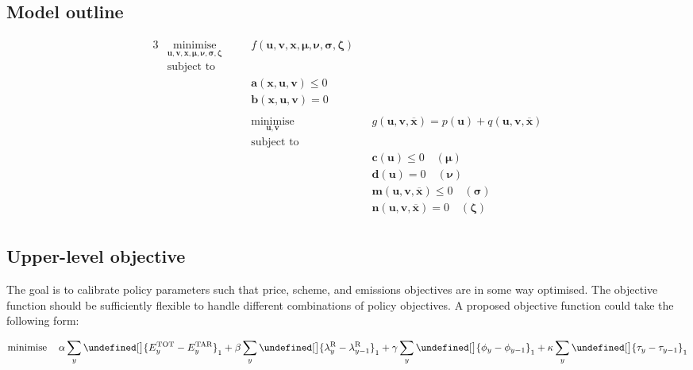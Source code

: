 \documentclass{article}
\newcommand{\iYear}{y}
\newcommand{\vBaseline}[1][\iYear]{\phi_{#1}}
\newcommand{\vPermitPrice}[1][\iYear]{\tau_{#1}}
\newcommand{\vEmissionsTotal}{E^{\textrm{TOT}}_{\iYear}}
\newcommand{\cEmissionsTarget}{E^{\textrm{TAR}}_{\iYear}}
\newcommand{\dPriceMetric}[1][\iYear]{\lambda^{\textrm{R}}_{#1}}
\let\norm\undefined %
\DeclarePairedDelimiter\norm{\lVert}{\rVert}
\DeclareMathOperator*{\minimise}{minimise}
\begin{document}
\subsection{Model outline}
\begin{alignat}{3}
& \minimise\limits_{\bm{u}, \bm{v}, \bm{x}, \bm{\mu}, \bm{\nu}, \bm{\sigma}, \bm{\zeta}} \quad && f\left(\bm{u}, \bm{v}, \bm{x}, \bm{\mu}, \bm{\nu}, \bm{\sigma}, \bm{\zeta}\right) \nonumber\\
& \textrm{subject to} \nonumber\\
& && \bm{a}(\bm{x}, \bm{u}, \bm{v}) \leq 0\\
& && \bm{b}(\bm{x}, \bm{u}, \bm{v}) = 0\\
& \\\nonumber
& && \minimise\limits_{\bm{u}, \bm{v}} \quad && g(\bm{u}, \bm{v}, \bm{\overline{x}}) = p(\bm{u}) + q(\bm{u}, \bm{v}, \bm{\overline{x}}) \nonumber\\
& && \textrm{subject to} \nonumber\\
& && && \bm{c}(\bm{u}) \leq 0 \quad \left(\bm{\mu}\right) \\
& && && \bm{d}(\bm{u}) = 0 \quad \left(\bm{\nu}\right)\\
& && && \bm{m}(\bm{u}, \bm{v}, \bm{\overline{x}}) \leq 0 \quad \left(\bm{\sigma}\right)\\
& && && \bm{n}(\bm{u}, \bm{v}, \bm{\overline{x}}) = 0 \quad \left(\bm{\zeta}\right)\\\nonumber
\end{alignat}

\subsection{Upper-level objective}
The goal is to calibrate policy parameters such that price, scheme, and emissions objectives are in some way optimised. The objective function should be sufficiently flexible to handle different combinations of policy objectives. A proposed objective function could take the following form:

\begin{equation}
	\minimise\limits_{} \quad \alpha \sum\limits_{\iYear} \norm[\big]{\vEmissionsTotal - \cEmissionsTarget}_{1} + \beta \sum\limits_{\iYear} \norm[\big]{\dPriceMetric - \dPriceMetric[\iYear - 1]}_{1} + \gamma \sum\limits_{\iYear} \norm[\big]{\vBaseline -\vBaseline[\iYear-1]}_{1} + \kappa \sum\limits_{\iYear} \norm[\big]{\vPermitPrice - \vPermitPrice[\iYear - 1]}_{1}
\end{equation}
\end{document}
